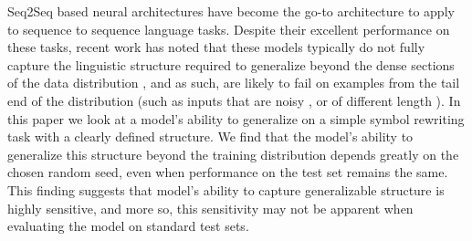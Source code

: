 Seq2Seq based neural architectures have become the go-to architecture to apply to sequence to sequence language tasks. Despite their excellent performance on these tasks, recent work has noted that these models typically do not fully capture the linguistic structure required to generalize beyond the dense sections of the data distribution \cite{ettinger2017towards}, and as such, are likely to fail on examples from the tail end of the distribution (such as inputs that are noisy \citep{belkinovnmtbreak}, or of different length \citep{bentivoglinmtlength}). In this paper we look at a model's ability to generalize on a simple symbol rewriting task with a clearly defined structure. We find that the model's ability to generalize this structure beyond the training distribution depends greatly on the chosen random seed, even when performance on the test set remains the same. This finding suggests that model's ability to capture generalizable structure is highly sensitive, and more so, this sensitivity may not be apparent when evaluating the model on standard test sets.
